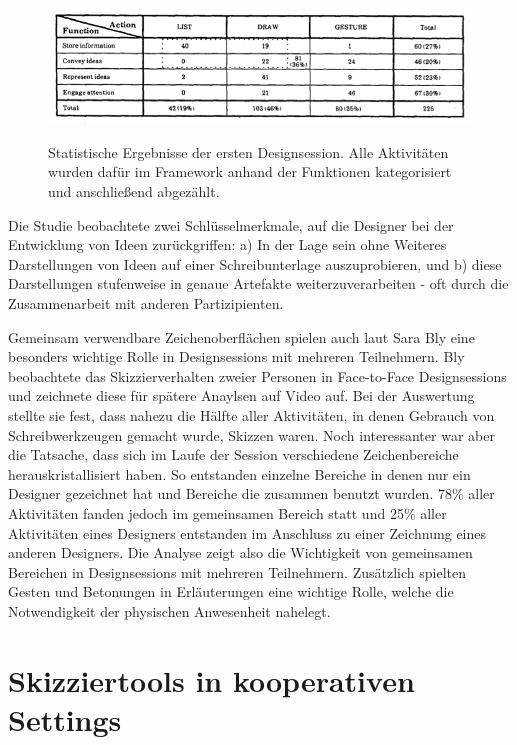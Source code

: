 \begin{figure}
        {\includegraphics[width=1\linewidth]{gfx/tangStatistik}}
		\caption[Statistische Ergebnisse der ersten Designsession.]{Statistische Ergebnisse der ersten Designsession. Alle Aktivitäten wurden dafür im Framework anhand der Funktionen kategorisiert und anschließend abgezählt.}\label{fig:tangStatistik}
\end{figure}
\clearpage

\medskip Die Studie beobachtete zwei Schlüsselmerkmale, auf die Designer bei der Entwicklung von Ideen zurückgriffen: a) In der Lage sein ohne Weiteres Darstellungen von Ideen auf einer Schreibunterlage auszuprobieren, und b) diese Darstellungen stufenweise in genaue Artefakte weiterzuverarbeiten - oft durch die Zusammenarbeit mit anderen Partizipienten. \citep{Tang:1988p279}

\medskip Gemeinsam verwendbare Zeichenoberflächen spielen auch laut Sara Bly \citep{Bly:1988:UDS:62266.62286} eine besonders wichtige Rolle in Designsessions mit mehreren Teilnehmern. 
Bly beobachtete das Skizzierverhalten zweier Personen in Face-to-Face Designsessions und zeichnete diese für spätere Anaylsen auf Video auf. Bei der Auswertung stellte sie fest, dass nahezu die Hälfte aller Aktivitäten, in denen Gebrauch von Schreibwerkzeugen gemacht wurde, Skizzen waren. Noch interessanter war aber die Tatsache, dass sich im Laufe der Session verschiedene Zeichenbereiche herauskristallisiert haben. So entstanden einzelne Bereiche in denen nur ein Designer gezeichnet hat und Bereiche die zusammen benutzt wurden. 78\% aller Aktivitäten fanden jedoch im gemeinsamen Bereich statt und 25\% aller Aktivitäten eines Designers entstanden im Anschluss zu einer Zeichnung eines anderen Designers. Die Analyse zeigt also die Wichtigkeit von gemeinsamen Bereichen in Designsessions mit mehreren Teilnehmern. Zusätzlich spielten Gesten und Betonungen in Erläuterungen eine wichtige Rolle, welche die Notwendigkeit der physischen Anwesenheit nahelegt.

\section{Skizziertools in kooperativen Settings}

